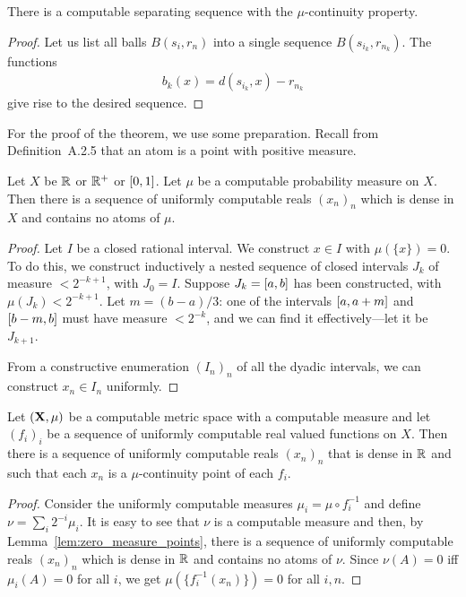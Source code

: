  \begin{corollary}
  \label{cor:g4.7.9}
  \notready
There is a computable separating sequence with the \( \mu \)-continuity property.
 \end{corollary}
 \begin{proof}
  \notready
Let us list all balls \( B(s_{i},r_{n}) \) into a single sequence
\( B(s_{i_{k}},r_{n_{k}}) \).
The functions 
 \begin{align*}
  b_{k}(x)=d(s_{i_{k}},x)-r_{n_{k}}
 \end{align*}
give rise to the desired sequence.
 \end{proof}

For the proof of the theorem, we use some preparation.
Recall from Definition~A.2.5 that an atom is a point with positive
measure.

\begin{lemma}\label{lem:zero_measure_points}
  \notready
Let \( X \) be \( \mathbb{R} \) or \( \mathbb{R}^+ \) or \( [0,1] \). 
Let \( \mu \) be a computable probability measure on \( X \). 
Then there is a sequence of uniformly computable reals \( (x_{n})_{n} \)
which is dense in \( X \) and contains no atoms of \( \mu \).
\end{lemma}
\begin{proof}
  \notready
Let \( I \) be a closed rational interval. 
We construct \( x\in I \) with \( \mu(\{x\})=0 \). 
To do this, we construct inductively a nested sequence of
closed intervals \( J_k \) of measure \( <2^{-k+1} \), with \( J_0=I \). 
Suppose \( J_k=[a,b] \) has been constructed, with \( \mu(J_k)<2^{-k+1} \). 
Let
\( m=(b-a)/3 \): one of the intervals \( [a,a+m] \) and \( [b-m,b] \) must
have measure \( <2^{-k} \), and we can find it effectively---let it be \( J_{k+1} \).

From a constructive enumeration \( (I_n)_n \) of all the dyadic intervals, we
can construct \( x_n\in I_n \) uniformly.
 \end{proof}

\begin{corollary}\label{coroll:sequence}
  \notready
Let \( (\mathbf{X},\mu) \) be a computable metric space with a computable measure
and let \( (f_i)_i \) be a sequence of uniformly computable real
valued functions on \( X \). 
Then there is a sequence of uniformly computable reals \( (x_n)_n \) that is
dense in \( \mathbb{R} \) and such that each \( x_{n} \) is a \( \mu \)-continuity point of each
\( f_{i} \). 
\end{corollary}
\begin{proof}
  \notready
Consider the uniformly computable measures \( \mu_i=\mu\circ f_i^{-1} \) and define
\( \nu=\sum_i2^{-i}\mu_i \).
It is easy to see that \( \nu \) is a computable measure and then, by
Lemma~\ref{lem:zero_measure_points}, there is a sequence of uniformly computable
reals \( (x_n)_n \) which is dense in \( \mathbb{R} \) and contains no atoms of \( \nu \). 
Since \( \nu(A)=0 \) iff \( \mu_i(A)=0 \) for all \( i \), we get \( \mu(\{f_i^{-1}(x_n)\})=0 \)
for all \( i,n \).
\end{proof}

